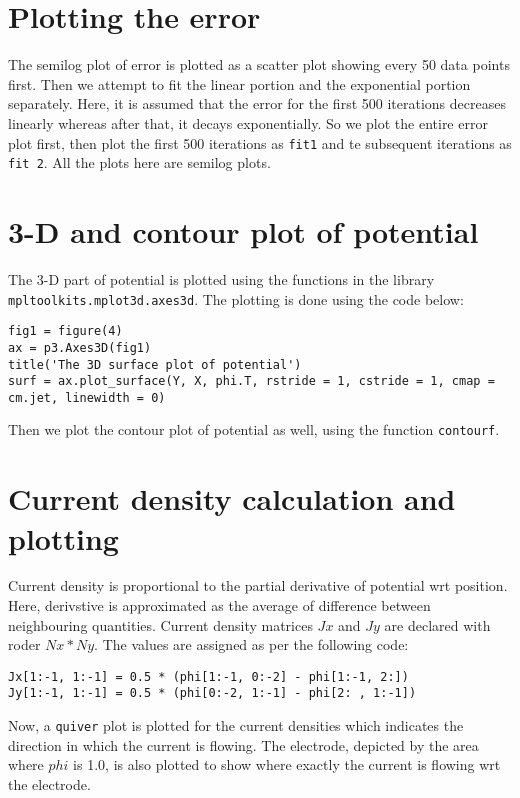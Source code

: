 \documentclass[11pt, a4paper]{article}
\begin{document}
\section{Plotting the error}
The semilog plot of error is plotted as a scatter plot showing every 50 data points first. Then we attempt to fit the linear portion and the exponential portion separately. Here, it is assumed that the error for the first 500 iterations decreases linearly whereas after that, it decays exponentially. So we plot the entire error plot first, then plot the first 500 iterations as \texttt{fit1} and te subsequent iterations as \texttt{fit 2}. All the plots here are semilog plots.

\section{3-D and contour plot of potential}
The 3-D part of potential is plotted using the functions in the library \texttt{mpltoolkits.mplot3d.axes3d}. The plotting is done using the code below:
\begin{verbatim}
fig1 = figure(4)   
ax = p3.Axes3D(fig1)  
title('The 3D surface plot of potential')  
surf = ax.plot_surface(Y, X, phi.T, rstride = 1, cstride = 1, cmap = cm.jet, linewidth = 0) 
\end{verbatim}

Then we plot the contour plot of potential as well, using the function \texttt{contourf}.

\section{Current density calculation and plotting}
Current density is proportional to the partial derivative of potential wrt position. Here, derivstive is approximated as the average of difference between neighbouring quantities. Current density matrices \(Jx\) and \(Jy\) are declared with roder \(Nx * Ny\). The values are assigned as per the following code:
\begin{verbatim}
Jx[1:-1, 1:-1] = 0.5 * (phi[1:-1, 0:-2] - phi[1:-1, 2:])
Jy[1:-1, 1:-1] = 0.5 * (phi[0:-2, 1:-1] - phi[2: , 1:-1])
\end{verbatim}

Now, a \texttt{quiver} plot is plotted for the current densities which indicates the direction in which the current is flowing. The electrode, depicted by the area where \(phi\) is 1.0, is also plotted to show where exactly the current is flowing wrt the electrode.
\end{document}
